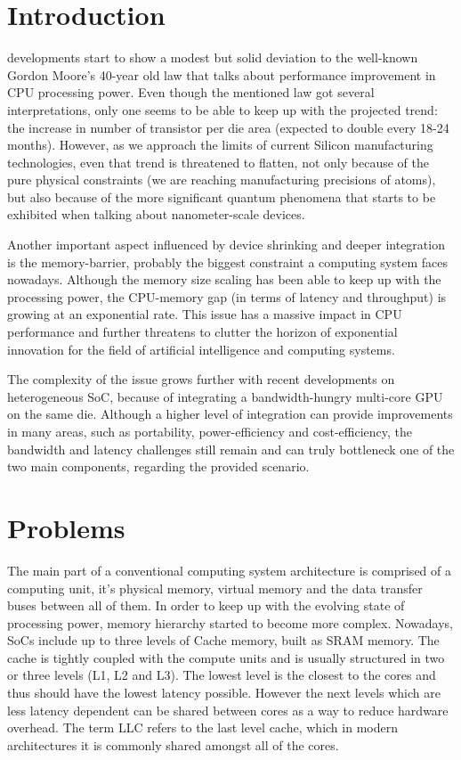 \documentclass[journal]{IEEEtran}
\begin{document}
\section{Introduction}
\indent {} developments start to show a modest but solid deviation to the well-known Gordon Moore's 40-year old law that talks about performance improvement in CPU processing power. Even though the mentioned law got several interpretations, only one seems to be able to keep up with the projected trend: the increase in number of transistor per die area (expected to double every 18-24 months). However, as we approach the limits of current Silicon manufacturing technologies, even that trend is threatened to flatten, not only because of the pure physical constraints (we are reaching manufacturing precisions of atoms), but also because of the more significant quantum phenomena that starts to be exhibited when talking about nanometer-scale devices.

Another important aspect influenced by device shrinking and deeper integration is the memory-barrier, probably the biggest constraint a computing system faces nowadays. Although the memory size scaling has been able to keep up with the processing power, the CPU-memory gap (in terms of latency and throughput) is growing at an exponential rate. This issue has a massive impact in CPU performance and further threatens to clutter the horizon of exponential innovation for the field of artificial intelligence and computing systems.

The complexity of the issue grows further with recent developments on heterogeneous SoC, because of integrating a bandwidth-hungry multi-core GPU on the same die. Although a higher level of integration can provide improvements in many areas, such as portability, power-efficiency and cost-efficiency, the bandwidth and latency challenges still remain and can truly bottleneck one of the two main components, regarding the provided scenario.

\section{Problems}
The main part of a conventional computing system architecture is comprised of a computing unit, it's physical memory, virtual memory and the data transfer buses between all of them. In order to keep up with the evolving state of processing power, memory hierarchy started to become more complex. Nowadays, SoCs include up to three levels of Cache memory, built as SRAM memory. The cache is tightly coupled with the compute units and is usually structured in two or three levels (L1, L2 and L3). The lowest level is the closest to the cores and thus should have the lowest latency possible. However the next levels which are less latency dependent can be shared between cores as a way to reduce hardware overhead. The term LLC refers to the last level cache, which in modern architectures it is commonly shared amongst all of the cores.
\end{document}
